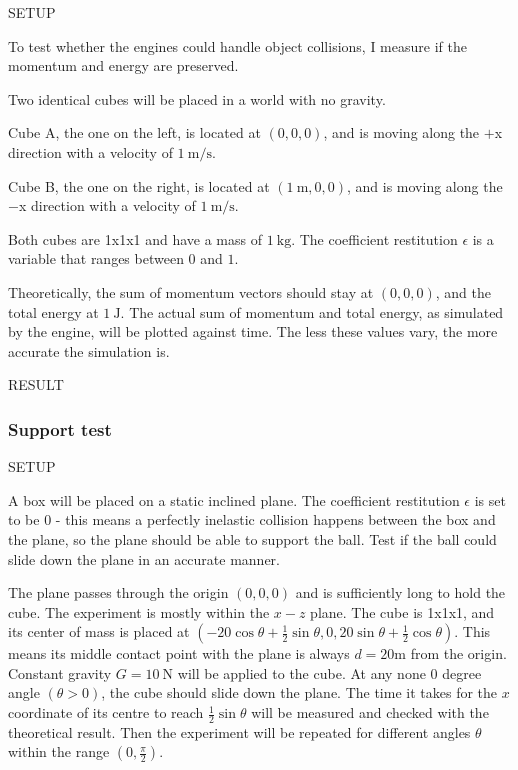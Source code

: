 \documentclass[runningheads]{llncs}
\begin{document}
\begin{itemize}
SETUP

To test whether the engines could handle object collisions, I measure if the momentum and energy are preserved.

Two identical cubes will be placed in a world with no gravity. 

Cube A, the one on the left, is located at $(0, 0, 0)$, and is moving along the $+$x direction with a velocity of $\SI{1}{\m\per\s}$.

Cube B, the one on the right, is located at $(\SI{1}{\m}, 0, 0)$, and is moving along the $-$x direction with a velocity of $\SI{1}{\m\per\s}$.

Both cubes are 1x1x1 and have a mass of $\SI{1}{\kg}$. The coefficient restitution $\epsilon$ is a variable that ranges between $0$ and $1$.

\begin{center}
\end{center}

Theoretically, the sum of momentum vectors should stay at $(0, 0, 0)$, and the total energy at $\SI{1}{\J}$.
The actual sum of momentum and total energy, as simulated by the engine, will be plotted against time.
The less these values vary, the more accurate the simulation is.

RESULT

\subsubsection{Support test}

SETUP

A box will be placed on a static inclined plane. The coefficient restitution $\epsilon$ is set to be $0$ - this means a perfectly inelastic collision happens between the box and the plane, so the plane should be able to support the ball. Test if the ball could slide down the plane in an accurate manner.

The plane passes through the origin $(0, 0, 0)$ and is sufficiently long to hold the cube. The experiment is mostly within the $x-z$ plane. The cube is 1x1x1, and its center of mass is placed at $(-20\cos \theta + \frac{1}{2}\sin \theta, 0, 20\sin\theta+\frac{1}{2}\cos \theta)$. This means its middle contact point with the plane is always $d=20$m from the origin. Constant gravity $G = \SI{10}{\N}$ will be applied to the cube. At any none $0$ degree angle $(\theta > 0)$, the cube should slide down the plane. The time it takes for the $x$ coordinate of its centre to reach $\frac{1}{2}\sin \theta$ will be measured and checked with the theoretical result. Then the experiment will be repeated for different angles $\theta$ within the range $(0, \frac{\pi}{2})$.


\end{itemize}
\end{document}
